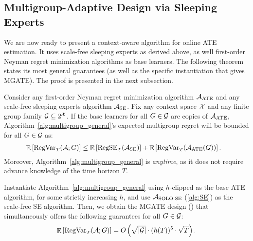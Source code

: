 \subsection{Multigroup-Adaptive Design via Sleeping Experts} \label{app:multigroup_general}


We are now ready to present a context-aware algorithm for online ATE estimation. It uses scale-free sleeping experts as derived above, as well first-order Neyman regret minimization algorithms as base learners. The following theorem states its most general guarantees (as well as the specific instantiation that gives MGATE). The proof is presented in the next subsection.


\begin{theorem} \label{thm:multigroup_general}
    Consider any first-order Neyman regret minimization algorithm $\mathcal{A}_\mathrm{ATE}$ and any scale-free sleeping experts algorithm $\mathcal{A}_\mathrm{SE}$. Fix any context space $\mathcal{X}$ and any finite group family $\mathcal{G} \subseteq 2^{\mathcal{X}}$. If the base learners for all $G \in \mathcal{G}$ are copies of $\mathcal{A}_\mathrm{ATE}$, Algorithm~\ref{alg:multigroup_general}'s expected multigroup regret will be bounded for all $G \in \mathcal{G}$ as:
    \begin{align*}
        &\mathop{\mathbb{E}} \left[\mathrm{RegVar}_T(\mathcal{A}; G) \right]
        \leq \mathop{\mathbb{E}} \left[\mathrm{RegSE}_T(\mathcal{A}_\mathrm{SE}) \right] + \mathop{\mathbb{E}} \left[\mathrm{RegVar}_T(\mathcal{A}_\mathrm{ATE}(G)) \right].
    \end{align*}
    Moreover, Algorithm~\ref{alg:multigroup_general} is \emph{anytime}, as it does not require advance knowledge of the time horizon $T$.
    
    Instantiate Algorithm~\ref{alg:multigroup_general} using $h$-clipped \ClipOGDSC as the base ATE algorithm, for some strictly increasing $h$, and use $\mathcal{A}_\text{SOLO SE}$ (\cref{alg:SE}) as the scale-free SE algorithm. Then, we obtain the MGATE design () that simultaneously offers the following guarantees for all $G \in \mathcal{G}$:
    \[
    \mathop{\mathbb{E}} \left[\mathrm{RegVar}_T(\mathcal{A}; G) \right] = O \left( \sqrt{|\mathcal{G}|} \cdot (h(T))^5 \cdot \sqrt{T} \right).
    \]
\end{theorem}


